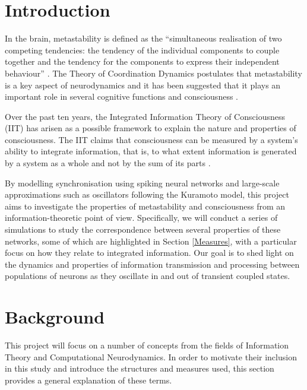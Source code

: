 \documentclass[a4paper,11pt]{article}
\begin{document}
\clearpage

\tableofcontents

\clearpage

\section{Introduction}

In the brain, metastability is defined as the ``simultaneous realisation of two competing tendencies: the tendency of the individual components to couple together and the tendency for the components to express their independent behaviour'' \cite{Kelso2012}. The Theory of Coordination Dynamics postulates that metastability is a key aspect of neurodynamics and it has been suggested that it plays an important role in several cognitive functions and consciousness \cite{Seth2009}. 

Over the past ten years, the Integrated Information Theory of Consciousness (IIT) has arisen as a possible framework to explain the nature and properties of consciousness. The IIT claims that consciousness can be measured by a system's ability to integrate information, that is, to what extent information is generated by a system as a whole and not by the sum of its parts \cite{Tononi2008a}.

By modelling synchronisation using spiking neural networks and large-scale approximations such as oscillators following the Kuramoto model, this project aims to investigate the properties of metastability and consciousness from an information-theoretic point of view. Specifically, we will conduct a series of simulations to study the correspondence between several properties of these networks, some of which are highlighted in Section \ref{Measures}, with a particular focus on how they relate to integrated information. Our goal is to shed light on the dynamics and properties of information transmission and processing between populations of neurons as they oscillate in and out of transient coupled states.

\section{Background}

This project will focus on a number of concepts from the fields of Information Theory and Computational Neurodynamics. In order to motivate their inclusion in this study and introduce the structures and measures used, this section provides a general explanation of these terms.
\end{document}
